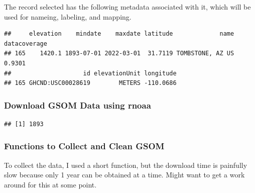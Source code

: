 \documentclass{article}\usepackage[]{graphicx}\usepackage[]{color}
\makeatletter
\newenvironment{kframe}{%
 \def\at@end@of@kframe{}%
 \ifinner\ifhmode%
  \def\at@end@of@kframe{\end{minipage}}%
  \begin{minipage}{\columnwidth}%
 \fi\fi%
 \def\FrameCommand##1{\hskip\@totalleftmargin \hskip-\fboxsep
 \colorbox{shadecolor}{##1}\hskip-\fboxsep
     \hskip-\linewidth \hskip-\@totalleftmargin \hskip\columnwidth}%
 \MakeFramed {\advance\hsize-\width
   \@totalleftmargin\z@ \linewidth\hsize
   \@setminipage}}%
 {\par\unskip\endMakeFramed%
 \at@end@of@kframe}
\newenvironment{knitrout}{}{} %
\makeatother
\begin{document}
The record selected has the following metadata associated with it, which will be used for nameing, labeling, and mapping. 

\begin{knitrout}
\color{fgcolor}\begin{kframe}
\begin{verbatim}
##     elevation    mindate    maxdate latitude             name datacoverage
## 165    1420.1 1893-07-01 2022-03-01  31.7119 TOMBSTONE, AZ US       0.9301
##                    id elevationUnit longitude
## 165 GHCND:USC00028619        METERS -110.0686
\end{verbatim}
\end{kframe}
\end{knitrout}

\subsubsection{Download GSOM Data using rnoaa}

\begin{knitrout}
\color{fgcolor}\begin{kframe}
\begin{verbatim}
## [1] 1893
\end{verbatim}
\end{kframe}
\end{knitrout}

\subsubsection{Functions to Collect and Clean GSOM}

To collect the data, I used a short function, but the download time is painfully slow because only 1 year can be obtained at a time. Might want to get a work around for this at some point. 
\end{document}
